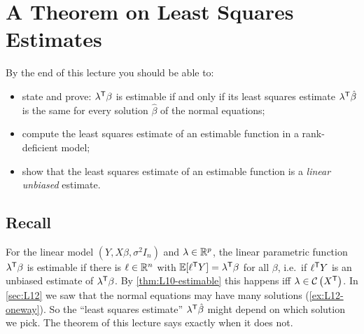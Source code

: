 \section{A Theorem on Least Squares Estimates}\label{sec:L13}


\begin{guiding*}
By the end of this lecture you should be able to:
\begin{itemize}
  \item state and prove: $\lambda^{\mathsf T}\beta$ is estimable if and only if its least squares estimate $\lambda^{\mathsf T}\hat\beta$ is the same for every solution $\hat\beta$ of the normal equations;
  \item compute the least squares estimate of an estimable function in a rank-deficient model;
  \item show that the least squares estimate of an estimable function is a \emph{linear unbiased} estimate.
\end{itemize}
\end{guiding*}

\subsection{Recall}
For the linear model $(Y,X\beta,\sigma^2I_n)$ and $\lambda\in\mathbb R^p$, the linear parametric function
$\lambda^{\mathsf T}\beta$ is estimable if there is $\ell\in\mathbb R^n$ with $\mathbb E[\ell^{\mathsf T} Y]=\lambda^{\mathsf T}\beta$ for all $\beta$, i.e.\ if
$\ell^{\mathsf T} Y$ is an unbiased estimate of $\lambda^{\mathsf T}\beta$. By \cref{thm:L10-estimable} this happens iff
$\lambda\in\mathcal{C}\left(X^{\mathsf T}\right)$. In \cref{sec:L12} we saw that the normal equations may have many solutions
(\cref{ex:L12-oneway}). So the ``least squares estimate'' $\lambda^{\mathsf T}\hat\beta$ might depend on which solution we
pick. The theorem of this lecture says exactly when it does not.

